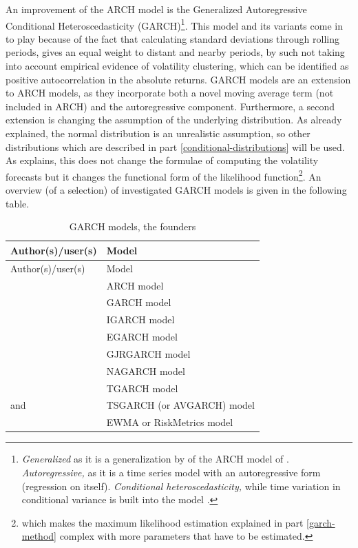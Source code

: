 \documentclass[a4paper, twoside]{templates/ociamthesis}
\begin{document}
\noindent An improvement of the ARCH model is the Generalized Autoregressive Conditional Heteroscedasticity (GARCH)\footnote{\emph{Generalized} as it is a generalization by \textcite{bollerslev1986} of the ARCH model of \textcite{engle1982}. \emph{Autoregressive,} as it is a time series model with an autoregressive form (regression on itself). \emph{Conditional heteroscedasticity,} while time variation in conditional variance is built into the model \autocite{alexander2008}.}. This model and its variants come in to play because of the fact that calculating standard deviations through rolling periods, gives an equal weight to distant and nearby periods, by such not taking into account empirical evidence of volatility clustering, which can be identified as positive autocorrelation in the absolute returns. GARCH models are an extension to ARCH models, as they incorporate both a novel moving average term (not included in ARCH) and the autoregressive component. Furthermore, a second extension is changing the assumption of the underlying distribution. As already explained, the normal distribution is an unrealistic assumption, so other distributions which are described in part \ref{conditional-distributions} will be used. As \textcite{alexander2008} explains, this does not change the formulae of computing the volatility forecasts but it changes the functional form of the likelihood function\footnote{which makes the maximum likelihood estimation explained in part \ref{garch-method} complex with more parameters that have to be estimated.}. An overview (of a selection) of investigated GARCH models is given in the following table.

\begin{longtable}[]{@{}ll@{}}
\caption{GARCH models, the founders}\tabularnewline
\toprule
Author(s)/user(s) & Model\tabularnewline
\midrule
\endfirsthead
\toprule
Author(s)/user(s) & Model\tabularnewline
\midrule
\endhead
\textcite{engle1982} & ARCH model\tabularnewline
\textcite{bollerslev1986} & GARCH model\tabularnewline
\textcite{bollerslev1986} & IGARCH model\tabularnewline
\textcite{nelson1991} & EGARCH model\tabularnewline
\textcite{glosten1993} & GJRGARCH model\tabularnewline
\textcite{engle1993} & NAGARCH model\tabularnewline
\textcite{zakoian1994} & TGARCH model\tabularnewline
\textcite{taylor1986} and \textcite{schwert1989} & TSGARCH (or AVGARCH) model\tabularnewline
\textcite{morganguarantytrustcompany1996} & EWMA or RiskMetrics model\tabularnewline
\bottomrule
\end{longtable}
\end{document}

